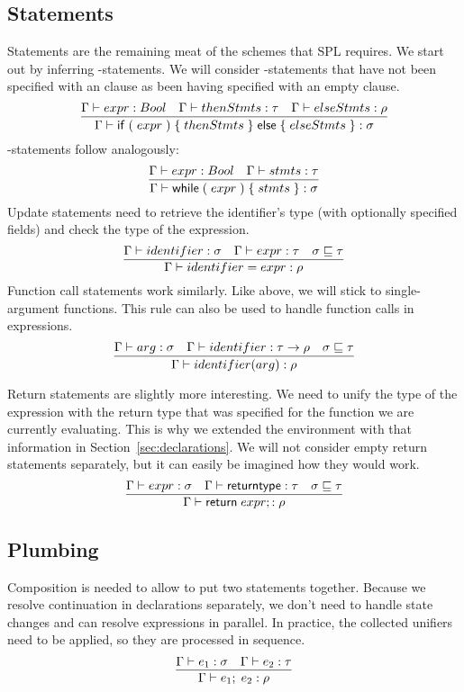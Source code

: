 \subsection{Statements}

Statements are the remaining meat of the schemes that SPL requires.
We start out by inferring -statements.
We will consider -statements that have not been specified with an  clause as been having specified with an empty  clause.
\[
    \infer{\Gamma \vdash \mathsf{if}\; (\; expr\;)\; \{\; thenStmts\; \}\;
    \mathsf{else}\; \{\; elseStmts\; \} : \sigma}{
            \Gamma \vdash expr : Bool &
            \Gamma \vdash thenStmts : \tau &
            \Gamma \vdash elseStmts : \rho
    }
\]
-statements follow analogously:
\[
    \infer{\Gamma \vdash \mathsf{while}\; (\; expr\;)\; \{\; stmts\; \}: \sigma}{
            \Gamma \vdash expr : Bool &
            \Gamma \vdash stmts : \tau
    }
\]
Update statements need to retrieve the identifier's type (with optionally specified fields) and check the type of the expression.
\[
    \infer{\Gamma \vdash identifier = expr : \rho}{
        \Gamma \vdash identifier : \sigma &
        \Gamma \vdash expr : \tau &
        \sigma \sqsubseteq \tau
    }
\]
Function call statements work similarly.
Like above, we will stick to single-argument functions.
This rule can also be used to handle function calls in expressions.
\[
    \infer{\Gamma \vdash identifier(arg) : \rho}{
        \Gamma \vdash arg : \sigma &
        \Gamma \vdash identifier : \tau \to \rho &
        \sigma \sqsubseteq \tau
    }
\]

Return statements are slightly more interesting.
We need to unify the type of the expression with the return type that was specified for the function we are currently evaluating.
This is why we extended the environment with that information in Section~\ref{sec:declarations}.
We will not consider empty return statements separately, but it can easily be imagined how they would work.
\[
    \infer{\Gamma \vdash \mathsf{return}\; expr; : \rho}{
        \Gamma \vdash expr : \sigma &
        \Gamma \vdash \mathsf{returntype} : \tau &
        \sigma \sqsubseteq \tau
    }
\]

\subsection{Plumbing}

Composition is needed to allow to put two statements together.
Because we resolve continuation in declarations separately, we don't need to handle state changes and can resolve expressions in parallel.
In practice, the collected unifiers need to be applied, so they are processed in sequence.
\[
    \infer{\Gamma \vdash e_1;\;e_2 : \rho}{
        \Gamma \vdash e_1 : \sigma &
        \Gamma \vdash e_2 : \tau
    }
\]

